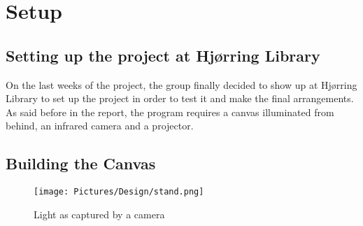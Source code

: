 \section{Setup}
\subsection{Setting up the project at Hj{\o}rring Library}
On the last weeks of the project, the group finally decided to show up at Hj{\o}rring Library to set up the project in order to test it and make the final arrangements. As said before in the report, the program requires a canvas illuminated from behind, an infrared camera and a projector.
\subsection{Building the Canvas}

\begin{figure}[htbp] 
\centering 
\texttt{[image: Pictures/Design/stand.png]} 
\caption{Light as captured by a camera} 
\label{fig:standPosition} 
\end{figure}



